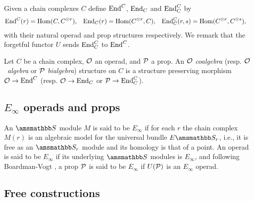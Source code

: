 Given a chain complexes $C$ define $\End^C$, $\End_C$ and $\End_C^C$ by
\begin{align*}
\End^C(r) &= \Hom(C, C^{\otimes r}),
& \End_C(r) &= \Hom(C^{\otimes r}, C),
& \End^C_C(r, s) &= \Hom(C^{\otimes r}, C^{\otimes s}),
\end{align*}
with their natural operad and prop structures respectively.
We remark that the forgetful functor $U$ sends $\End^C_C$ to $\End^C$.

Let $C$ be a chain complex, $\O$ an operad, and $\P$ a prop.
An $\O$ \textit{coalgebra} (resp. \mbox{$\O$ \textit{algebra}} or $\P$ \textit{bialgebra}) structure on $C$ is a structure preserving morphism $\O \to \End^C$ (resp. $\O \to \End_C$ or $\P \to \End_C^C$).

\subsection{$E_\infty$ operads and props}

An $\S$ module $M$ is said to be $E_\infty$ if for each $r$ the chain complex $M(r)$ is an algebraic model for the universal bundle $E\S_r$, i.e., it is free as an $\S_r$ module and its homology is that of a point.
An operad is said to be $E_\infty$ if its underlying $\S$ modules is $E_\infty$, and following Boardman-Vogt \cite{boardman2006homotopy}, a prop $\P$ is said to be $E_\infty$ if $U(\P)$ is an $E_\infty$ operad.

\subsection{Free constructions}

